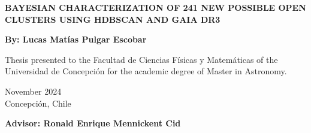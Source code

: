 \begin{titlepage}
	
	
	\thispagestyle{frontpage}
	
	\begin{center}
		
		\vspace*{4\baselineskip}
	
		
		{\Huge \textbf{BAYESIAN CHARACTERIZATION OF 241 NEW POSSIBLE OPEN CLUSTERS USING HDBSCAN AND GAIA DR3\\}}%
		        \vspace*{1.5\baselineskip}

		\large{\textbf{By: Lucas Matías Pulgar Escobar}}\\ %
		
		\vspace{1.5\baselineskip}
		
		\large{Thesis presented to the Facultad de Ciencias Físicas y Matemáticas of the Universidad de Concepción for the academic degree of Master in Astronomy.} %
		
		\vspace{1.5\baselineskip}
		November 2024\\ %
		Concepción, Chile %
\vspace{1.5\baselineskip}

		\large{\textbf{Advisor: Ronald Enrique Mennickent Cid}}\\ %

	\end{center}
	
	\vspace*{4\baselineskip}
	
	
\end{titlepage}
